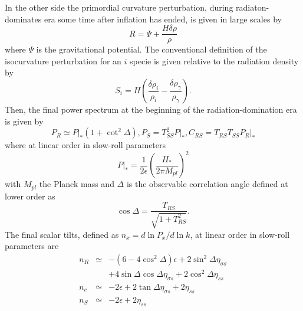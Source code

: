 \documentclass[a4paper,fleqn,usenatbib,useAMS]{mnras}
\begin{document}
In the other side the primordial curvature perturbation, during radiaton-dominates era some time after inflation has ended, is given in large scales by
\begin{equation}
R=\Psi+\frac{H\delta\rho}{\rho}
\end{equation}
where $\Psi$ is the gravitational potential. The conventional definition of the isocurvature perturbation for an $i$ specie is given relative to the radiation density by
\begin{equation}
S_i=H\left(\frac{\delta\rho_{i}}{\rho_{i}}-\frac{\delta\rho_\gamma}{\rho_\gamma}\right).
\end{equation}
Then, the final power spectrum at the beginning of the radiation-domination era is given by
\begin{subequations}\label{spectrums}
\begin{equation}\label{PRf}
P_R\simeq P|_*(1+\cot^2\Delta),
\end{equation}
\begin{equation}
P_S=T^2_{SS}P|_*,
\end{equation}
\begin{equation}
C_{RS}=T_{RS}T_{SS}P_R|_*
\end{equation}
\end{subequations}
where at linear order in slow-roll parameters
\begin{equation}
P|_*=\frac{1}{2\epsilon}\left(\frac{H_*}{2\pi M_{pl}}\right)^2
\end{equation}
with $M_{pl}$ the Planck mass and $\Delta$ is the observable correlation angle defined at lower order as
\begin{equation}
\cos\Delta =\frac{T_{RS}}{\sqrt{1+T_{RS}^2}}.
\end{equation}
The final scalar tilts, defined as $n_x=d\ln P_x/d\ln k$, at linear order in slow-roll parameters are
\begin{subequations}\label{tilts}
\begin{eqnarray}
n_R&\simeq & -(6-4\cos^2\Delta)\epsilon+2\sin^2\Delta\eta_{\sigma\sigma}\nonumber \\ &&+4\sin\Delta\cos\Delta\eta_{\sigma s}+2\cos^2\Delta\eta_{ss}\\
n_c&\simeq &-2\epsilon+2\tan\Delta\eta_{\sigma s}+2\eta_{ss}\\
n_S&\simeq & -2\epsilon+2\eta_{ss}
\end{eqnarray}
\end{subequations}
\end{document}
